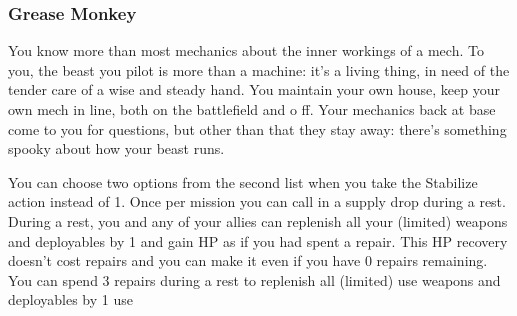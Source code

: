 \subsubsection{Grease Monkey}

\begin{talent}
{You know more than most mechanics about the inner workings of a mech. To you, the beast you pilot is more than a machine: it’s a living thing, in need of the tender care of a wise and steady hand. You maintain your own house, keep your own mech in line, both on the battlefield and o ff. Your mechanics back at base come to you for questions, but other than that they stay away: there’s something spooky about how your beast runs.}

You can choose two options from the second list when you take the Stabilize action instead of 1. 
Once per mission you can call in a supply drop during a rest. During a rest, you and any of your allies can replenish all your (limited) weapons and deployables by 1 and gain HP as if you had spent a repair. This HP recovery doesn’t cost repairs and you can make it even if you have 0 repairs remaining. 
You can spend 3 repairs during a rest to replenish all (limited) use weapons and deployables by 1 use
\end{talent}
